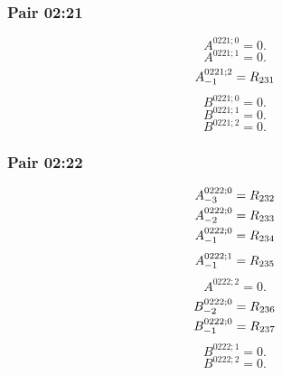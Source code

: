 \documentclass[11pt,a4paper]{article}
\begin{document}
\subsubsection{Pair 02:21}
\begin{equation}
A^{0221;0}=0.
\label{eq:cat-map-204}
\end{equation}
\begin{equation}
A^{0221;1}=0.
\label{eq:cat-map-205}
\end{equation}
\begin{equation}
\shortstack[l]{$\displaystyle A^{0221;2}_{-1}=R_{231}$}
\label{eq:cat-map-206}
\end{equation}
\begin{equation}
B^{0221;0}=0.
\label{eq:cat-map-207}
\end{equation}
\begin{equation}
B^{0221;1}=0.
\label{eq:cat-map-208}
\end{equation}
\begin{equation}
B^{0221;2}=0.
\label{eq:cat-map-209}
\end{equation}
\subsubsection{Pair 02:22}
\begin{equation}
\shortstack[l]{$\displaystyle A^{0222;0}_{-3}=R_{232}$\\
$\displaystyle A^{0222;0}_{-2}=R_{233}$\\
$\displaystyle A^{0222;0}_{-1}=R_{234}$}
\label{eq:cat-map-210}
\end{equation}
\begin{equation}
\shortstack[l]{$\displaystyle A^{0222;1}_{-1}=R_{235}$}
\label{eq:cat-map-211}
\end{equation}
\begin{equation}
A^{0222;2}=0.
\label{eq:cat-map-212}
\end{equation}
\begin{equation}
\shortstack[l]{$\displaystyle B^{0222;0}_{-2}=R_{236}$\\
$\displaystyle B^{0222;0}_{-1}=R_{237}$}
\label{eq:cat-map-213}
\end{equation}
\begin{equation}
B^{0222;1}=0.
\label{eq:cat-map-214}
\end{equation}
\begin{equation}
B^{0222;2}=0.
\label{eq:cat-map-215}
\end{equation}
\end{document}
